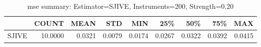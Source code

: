 \begin{table}[ht]
\centering
\caption{mse summary: Estimator=SJIVE, Instruments=200, Strength=0.20}
\begin{tabular}{lrrrrrrrr}
\toprule
 & COUNT & MEAN & STD & MIN & 25\% & 50\% & 75\% & MAX \\
\midrule
SJIVE & 10.0000 & 0.0321 & 0.0079 & 0.0174 & 0.0267 & 0.0322 & 0.0392 & 0.0415 \\
\bottomrule
\end{tabular}
\end{table}
